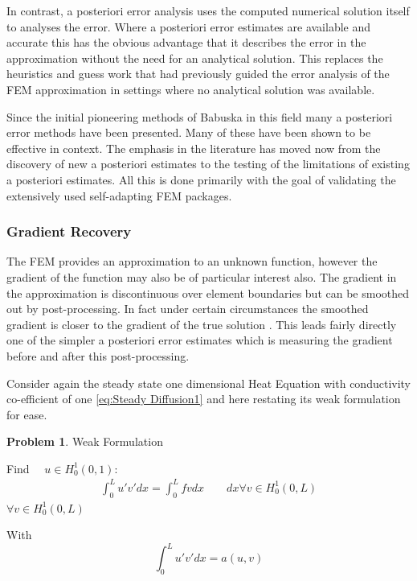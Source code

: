 \documentclass{uonmathreport}
\theoremstyle{definition}
\theoremstyle{problem}
\newtheorem{problem}{Problem}[section]
\theoremstyle{theorem}
\begin{document}
{In contrast, a posteriori error analysis uses the computed numerical solution itself to analyses the error. Where a posteriori error estimates are available and accurate this has the obvious advantage that it describes the error in the approximation without the need for an analytical solution. This replaces the heuristics and guess work that had previously guided the error analysis of the FEM approximation in settings where no analytical solution was available. 

Since the initial pioneering methods of Babuska \cite{babuska1978posteriori} \cite{babuska1981posteriori} in this field many a posteriori error methods have been presented. Many of these have been shown to be effective in context. The emphasis in the literature has moved now from the discovery of new a posteriori estimates to the testing of the limitations of existing a posteriori estimates. All this is done primarily with the goal of validating the extensively used self-adapting FEM packages.

\subsubsection{Gradient Recovery} \label{subsubsec:KK}

The FEM provides an approximation to an unknown function, however the gradient of the function may also be of particular interest also. The gradient in the approximation is discontinuous over element boundaries but can be smoothed out by post-processing. In fact under certain circumstances the smoothed gradient is closer to the gradient of the true solution \cite{ainsworth65001posteriori}. This leads fairly directly one of the simpler a posteriori error estimates which is measuring the gradient before and after this post-processing.

Consider again the steady state one dimensional Heat Equation with conductivity co-efficient of one \ref{eq:Steady Diffusion1} and here restating its weak formulation for ease.

\begin{problem}{Weak Formulation}

Find $\quad u \in H^1_0(0, 1)$:
\begin{align*}
\int_0^L  u' v'  dx =   \int_0^L  f v dx  \quad \quad  dx \forall v \in H^1_0(0, L)
\end{align*}
$\forall v \in H^1_0(0, L)$
\end{problem}

With
\begin{equation*}
\int_0^L  u' v'  dx = a(u, v)  	
\end{equation*}

}
\end{document}
